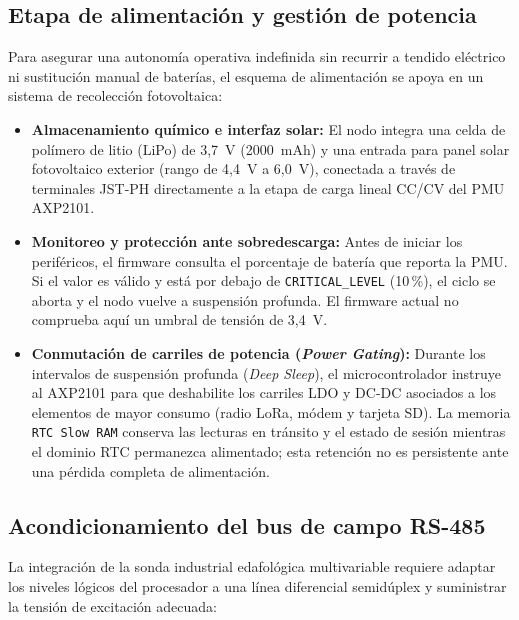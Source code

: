 \subsection{Etapa de alimentación y gestión de potencia}
Para asegurar una autonomía operativa indefinida sin recurrir a tendido eléctrico ni sustitución manual de baterías, el esquema de alimentación se apoya en un sistema de recolección fotovoltaica:

\begin{itemize}
    \item \textbf{Almacenamiento químico e interfaz solar:} El nodo integra una celda de polímero de litio (LiPo) de 3,7~V (2000~mAh) y una entrada para panel solar fotovoltaico exterior (rango de 4,4~V a 6,0~V), conectada a través de terminales JST-PH directamente a la etapa de carga lineal CC/CV del PMU AXP2101.
    \item \textbf{Monitoreo y protección ante sobredescarga:} Antes de iniciar los periféricos, el firmware consulta el porcentaje de batería que reporta la PMU. Si el valor es válido y está por debajo de \texttt{CRITICAL\_LEVEL} (10\,\%), el ciclo se aborta y el nodo vuelve a suspensión profunda. El firmware actual no comprueba aquí un umbral de tensión de 3,4~V.
    \item \textbf{Conmutación de carriles de potencia (\textit{Power Gating}):} Durante los intervalos de suspensión profunda (\textit{Deep Sleep}), el microcontrolador instruye al AXP2101 para que deshabilite los carriles LDO y DC-DC asociados a los elementos de mayor consumo (radio LoRa, módem y tarjeta SD). La memoria \texttt{RTC Slow RAM} conserva las lecturas en tránsito y el estado de sesión mientras el dominio RTC permanezca alimentado; esta retención no es persistente ante una pérdida completa de alimentación.
\end{itemize}

\subsection{Acondicionamiento del bus de campo RS-485}
La integración de la sonda industrial edafológica multivariable requiere adaptar los niveles lógicos del procesador a una línea diferencial semidúplex y suministrar la tensión de excitación adecuada:

